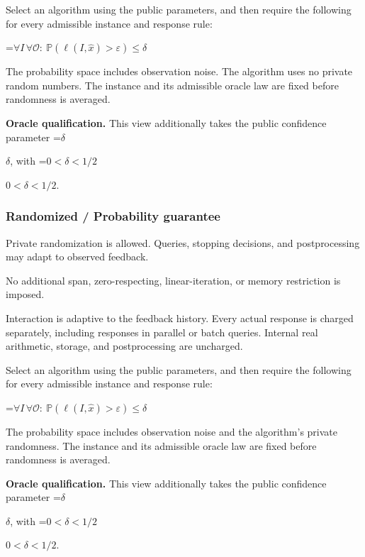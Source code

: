 \documentclass[10pt,a4paper]{article}
\newcommand{\AtlasMath}[1]{\par\begingroup\centering\setbox0=\hbox{$\displaystyle #1$}\ifdim\wd0>1.4\linewidth\typeout{ATLAS WIDE FORMULA: \the\wd0}\fi\ifdim\wd0>\linewidth\resizebox{\linewidth}{!}{\box0}\else\box0\fi\par\endgroup}
\newcommand{\AtlasInlineMath}[1]{\begingroup\setbox0=\hbox{$#1$}\ifdim\wd0>.4\linewidth\endgroup\AtlasMath{#1}\else\endgroup$#1$\fi}
\begin{document}
Select an algorithm using the public parameters, and then require the following for every admissible instance and response rule:




\AtlasMath{\forall I\,\forall\mathcal{O}:\ \mathbb{P}(\ell(I,\widehat{x})>\varepsilon)\le\delta}




The probability space includes observation noise. The algorithm uses no private random numbers. The instance and its admissible oracle law are fixed before randomness is averaged.



\textbf{Oracle qualification.} This view additionally takes the public confidence parameter \AtlasInlineMath{\delta}, with \AtlasInlineMath{0<\delta<1/2}.



\subsubsection{Randomized / Probability guarantee}


Private randomization is allowed. Queries, stopping decisions, and postprocessing may adapt to observed feedback.



No additional span, zero-respecting, linear-iteration, or memory restriction is imposed.



Interaction is adaptive to the feedback history. Every actual response is charged separately, including responses in parallel or batch queries. Internal real arithmetic, storage, and postprocessing are uncharged.



Select an algorithm using the public parameters, and then require the following for every admissible instance and response rule:




\AtlasMath{\forall I\,\forall\mathcal{O}:\ \mathbb{P}(\ell(I,\widehat{x})>\varepsilon)\le\delta}




The probability space includes observation noise and the algorithm's private randomness. The instance and its admissible oracle law are fixed before randomness is averaged.



\textbf{Oracle qualification.} This view additionally takes the public confidence parameter \AtlasInlineMath{\delta}, with \AtlasInlineMath{0<\delta<1/2}.
\end{document}
